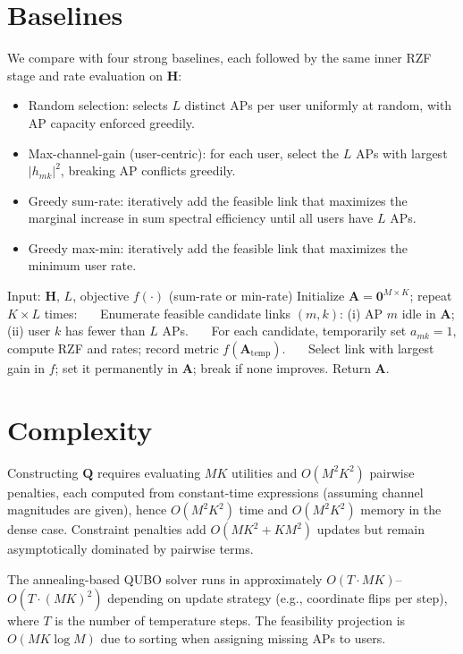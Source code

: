 \section{Baselines}
We compare with four strong baselines, each followed by the same inner RZF stage and rate evaluation on $\mathbf{H}$:
\begin{itemize}
\item Random selection: selects $L$ distinct APs per user uniformly at random, with AP capacity enforced greedily.
\item Max-channel-gain (user-centric): for each user, select the $L$ APs with largest $|h_{mk}|^2$, breaking AP conflicts greedily.
\item Greedy sum-rate: iteratively add the feasible link that maximizes the marginal increase in sum spectral efficiency until all users have $L$ APs.
\item Greedy max-min: iteratively add the feasible link that maximizes the minimum user rate.
\end{itemize}

\begin{algorithm}[htbp]
\caption{Greedy Sum-Rate and Greedy Max-Min (Selection Only)}
\begin{algorithmic}[1]
\State Input: $\mathbf{H}$, $L$, objective $f(\cdot)$ (sum-rate or min-rate)
\State Initialize $\mathbf{A}=\mathbf{0}^{M\times K}$; repeat $K\!\times\!L$ times:
\State ~~~Enumerate feasible candidate links $(m,k)$: (i) AP $m$ idle in $\mathbf{A}$; (ii) user $k$ has fewer than $L$ APs.
\State ~~~For each candidate, temporarily set $a_{mk}\!=\!1$, compute RZF and rates; record metric $f(\mathbf{A}_{\text{temp}})$.
\State ~~~Select link with largest gain in $f$; set it permanently in $\mathbf{A}$; break if none improves.
\State Return $\mathbf{A}$.
\end{algorithmic}
\end{algorithm}

\section{Complexity}
Constructing $\mathbf{Q}$ requires evaluating $MK$ utilities and $O(M^2K^2)$ pairwise penalties, each computed from constant-time expressions (assuming channel magnitudes are given), hence $O(M^2K^2)$ time and $O(M^2K^2)$ memory in the dense case. Constraint penalties add $O(MK^2+KM^2)$ updates but remain asymptotically dominated by pairwise terms.

The annealing-based QUBO solver runs in approximately $O(T\cdot MK)$–$O(T\cdot (MK)^2)$ depending on update strategy (e.g., coordinate flips per step), where $T$ is the number of temperature steps. The feasibility projection is $O(MK\log M)$ due to sorting when assigning missing APs to users.

